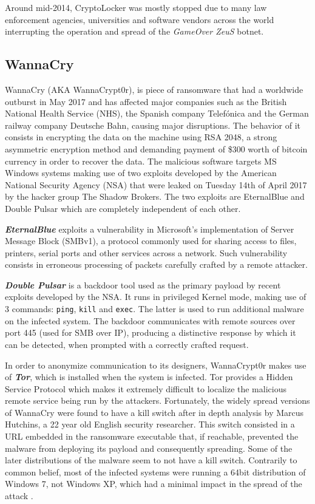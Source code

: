 \documentclass[10pt,a4paper]{article}
\begin{document}
Around mid-2014, CryptoLocker was mostly stopped due to many law enforcement agencies, universities and software vendors across the world interrupting the operation and spread of the \textit{GameOver ZeuS} botnet.

\subsection{WannaCry}
WannaCry (AKA WannaCrypt0r), is piece of ransomware that had a worldwide outburst in May 2017 and has affected major companies such as the British National Health Service (NHS), the Spanish company Telefónica and the German railway company Deutsche Bahn, causing major disruptions. The behavior of it consists in encrypting the data on the machine using RSA 2048, a strong asymmetric encryption method and demanding payment of \$300 worth of bitcoin currency in order to recover the data. The malicious software targets MS Windows systems making use of two exploits developed by the American National Security Agency (NSA) that were leaked on Tuesday 14th of April 2017 by the hacker group The Shadow Brokers. The two exploits are EternalBlue and Double Pulsar which are completely independent of each other.

\textbf{\textit{EternalBlue}} exploits a vulnerability in Microsoft's implementation of Server Message Block (SMBv1), a protocol commonly used for sharing access to files, printers, serial ports and other services across a network. Such vulnerability consists in erroneous processing of packets carefully crafted by a remote attacker.

\textbf{\textit{Double Pulsar}} is a backdoor tool used as the primary payload by recent exploits developed by the NSA. It runs in privileged Kernel mode, making use of 3 commands: \texttt{ping}, \texttt{kill} and \texttt{exec}. The latter is used to run additional malware on the infected system. The backdoor communicates with remote sources over port 445 (used for SMB over IP), producing a distinctive response by which it can be detected, when prompted with a correctly crafted request.

In order to anonymize communication to its designers, WannaCrypt0r makes use of \textit{\textbf{Tor}}, which is installed when the system is infected. Tor provides a Hidden Service Protocol \cite{torcircuits} which makes it extremely difficult to localize the malicious remote service being run by the attackers.
Fortunately, the widely spread versions of WannaCry were found to have a kill switch after in depth analysis by Marcus Hutchins, a 22 year old English security researcher. This switch consisted in a URL  embedded in the ransomware executable that, if reachable, prevented the malware from deploying its payload and consequently spreading. Some of the later distributions of the malware seem to not have a kill switch. Contrarily to common belief, most of the infected systems were running a 64bit distribution of Windows 7, not Windows XP, which had a minimal impact in the spread of the attack \cite{wanacrySystems}.
\end{document}
